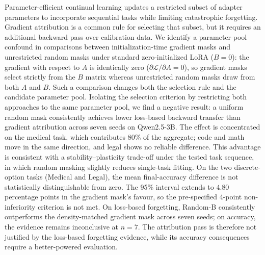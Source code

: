 Parameter-efficient continual learning updates a restricted subset of adapter parameters to incorporate sequential tasks while limiting catastrophic forgetting. Gradient attribution is a common rule for selecting that subset, but it requires an additional backward pass over calibration data. We identify a parameter-pool confound in comparisons between initialization-time gradient masks and unrestricted random masks under standard zero-initialized LoRA ($B=0$): the gradient with respect to $A$ is identically zero ($\partial\mathcal{L}/\partial A=0$), so gradient masks select strictly from the $B$ matrix whereas unrestricted random masks draw from both $A$ and $B$. Such a comparison changes both the selection rule and the candidate parameter pool. Isolating the selection criterion by restricting both approaches to the same parameter pool, we find a negative result: a uniform random mask consistently achieves lower loss-based backward transfer than gradient attribution across seven seeds on Qwen2.5-3B. The effect is concentrated on the medical task, which contributes 80\% of the aggregate; code and math move in the same direction, and legal shows no reliable difference. This advantage is consistent with a stability--plasticity trade-off under the tested task sequence, in which random masking slightly reduces single-task fitting. On the two discrete-option tasks (Medical and Legal), the mean final-accuracy difference is not statistically distinguishable from zero. The 95\% interval extends to $4.80$ percentage points in the gradient mask's favour, so the pre-specified 4-point non-inferiority criterion is not met. On loss-based forgetting, Random-B consistently outperforms the density-matched gradient mask across seven seeds; on accuracy, the evidence remains inconclusive at $n=7$. The attribution pass is therefore not justified by the loss-based forgetting evidence, while its accuracy consequences require a better-powered evaluation.
